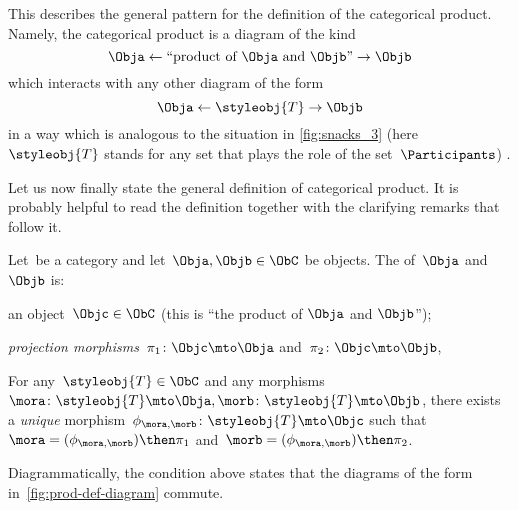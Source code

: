 This describes the general pattern for the definition of the categorical product.
Namely, the categorical product is a diagram of the kind
\begin{equation}
    \label{eq:prod-inline-generic-diagram}
    \Obja \leftarrow \text{``product of } \Obja \text{ and } \Objb \text{''}  \rightarrow \Objb
\end{equation}
which interacts with any other diagram of the form
\begin{equation}
    \label{eq:prod-inline-test-diagram}
    \Obja \leftarrow \styleobj{T} \rightarrow \Objb
\end{equation}
in a way which is analogous to the situation in \cref{fig:snacks_3} (here~$\styleobj{T}$ stands for any set that plays the role of the set~$\Participants$) .

Let us now finally state the general definition of categorical product.
It is probably helpful to read the definition together with the clarifying remarks that follow it.


\begin{ctdefinition}
    \label{def:categorical-product}
    Let~\CatC be a category and let~$\Obja, \Objb \in \ObC$ be objects.
    The \emph{} of~$\Obja$ and~$\Objb$ is: \\
    \constit
    \begin{compactenum}
        \item an object~$\Objc \in \ObC$ (this is ``the product of $\Obja$  and $\Objb$'');
        \item \emph{projection morphisms}~$\pi_1 \colon \Objc \mto \Obja$ and~$\pi_2 \colon \Objc \mto \Objb$,
    \end{compactenum}
    \condit
    \begin{compactenum}
        \item For any~$\styleobj{T} \in \ObC$ and any morphisms~$\mora \colon \styleobj{T} \mto \Obja, \morb \colon \styleobj{T} \mto \Objb$, there exists a \emph{unique} morphism~$\phi_{\mora,\morb} \colon \styleobj{T} \mto \Objc$ such that~$\mora = (\phi_{\mora,
        \morb})\then \pi_1$ and~$\morb=(\phi_{\mora, \morb})\then \pi_2$.
    \end{compactenum}
\end{ctdefinition}

\begin{marginfigure}
    \centering
    \caption{}
    \label{fig:prod-def-diagram}
\end{marginfigure}
\begin{remark}
    \label{re:prod-comm-diag}
    Diagrammatically, the condition above states that the diagrams of the form
    in~\cref{fig:prod-def-diagram} commute.
\end{remark}

